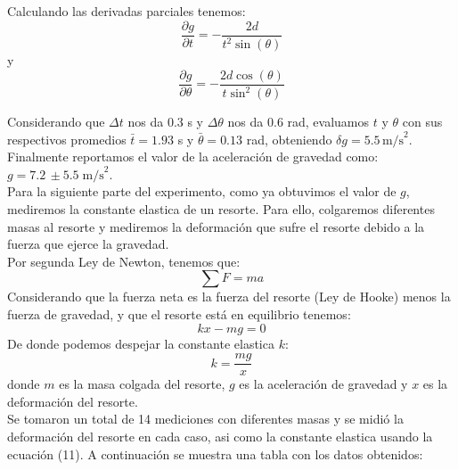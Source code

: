 \documentclass{article}
\begin{document}
Calculando las derivadas parciales tenemos:
\begin{equation}
   \dfrac{\partial g}{\partial t} = -\dfrac{2d}{t^2 \sin(\theta)}
\end{equation}
y
\begin{equation}
   \dfrac{\partial g}{\partial \theta} = -\dfrac{2d \cos(\theta)}{t \sin^2(\theta)}
\end{equation}

Considerando que $\Delta t$ nos da 0.3 s y $\Delta \theta$ nos da 0.6 rad,
evaluamos $t$ y $\theta$ con sus respectivos promedios $\bar{t} = 1.93$ s y
$\bar{\theta} = 0.13$ rad, obteniendo $\delta g = 5.5 \, \text{m/s}^2$. \\

Finalmente reportamos el valor de la aceleración de gravedad como: 
$g = 7.2 \, \pm 5.5 \; \text{m/s}^2$. \\

Para la siguiente parte del experimento, como ya obtuvimos el valor de $g$, 
mediremos la constante elastica de un resorte. Para ello, colgaremos 
diferentes masas al resorte y mediremos la deformación que sufre el resorte
debido a la fuerza que ejerce la gravedad. \\

Por segunda Ley de Newton, 
tenemos que:
\begin{equation}
   \sum F = ma
\end{equation}
Considerando que la fuerza neta es la fuerza del resorte (Ley de Hooke) 
menos la fuerza de gravedad, y que el resorte está en equilibrio tenemos:
\begin{equation}
   kx - mg = 0
\end{equation}
De donde podemos despejar la constante elastica $k$:
\begin{equation}
   k = \dfrac{mg}{x}
\end{equation}
donde $m$ es la masa colgada del resorte, $g$ es la aceleración de gravedad
y $x$ es la deformación del resorte. \\

Se tomaron un total de 14 mediciones con diferentes masas y se midió la
deformación del resorte en cada caso, asi como la constante elastica usando
la ecuación (11). A continuación se muestra una tabla con los datos 
obtenidos:
\end{document}
